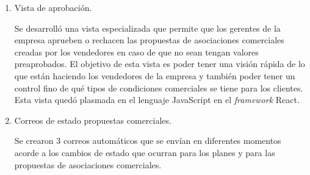\begin{enumerate}
    \item Vista de aprobación.
    
    Se desarrolló una vista especializada que permite que los gerentes de la empresa aprueben o rechacen las propuestas de asociaciones comerciales creadas por los vendedores en caso de que no sean tengan valores preaprobados. El objetivo de esta vista es poder tener una visión rápida de lo que están haciendo los vendedores de la empresa y también poder tener un control fino de qué tipos de condiciones comerciales se tiene para los clientes. Esta vista quedó plasmada en el lenguaje JavaScript en el \textit{framework} React.
    
    \item Correos de estado propuestas comerciales.
    
    Se crearon 3 correos automáticos que se envían en diferentes momentos acorde a los cambios de estado que ocurran para los planes y para las propuestas de asociaciones comerciales.

  \end{enumerate}